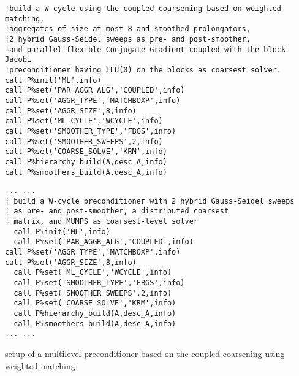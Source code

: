 \begin{listing}[h!]
\ifpdf
\begin{verbatim}
!build a W-cycle using the coupled coarsening based on weighted matching, 
!aggregates of size at most 8 and smoothed prolongators,
!2 hybrid Gauss-Seidel sweeps as pre- and post-smoother,
!and parallel flexible Conjugate Gradient coupled with the block-Jacobi 
!preconditioner having ILU(0) on the blocks as coarsest solver. 
call P%init('ML',info)
call P%set('PAR_AGGR_ALG','COUPLED',info)
call P%set('AGGR_TYPE','MATCHBOXP',info)
call P%set('AGGR_SIZE',8,info)
call P%set('ML_CYCLE','WCYCLE',info)
call P%set('SMOOTHER_TYPE','FBGS',info)
call P%set('SMOOTHER_SWEEPS',2,info)
call P%set('COARSE_SOLVE','KRM',info)
call P%hierarchy_build(A,desc_A,info)
call P%smoothers_build(A,desc_A,info)
\end{verbatim}
\else
\begin{center}
\begin{minipage}{.90\textwidth}
{\small
\begin{verbatim}
... ...
! build a W-cycle preconditioner with 2 hybrid Gauss-Seidel sweeps
! as pre- and post-smoother, a distributed coarsest
! matrix, and MUMPS as coarsest-level solver
  call P%init('ML',info)
  call P%set('PAR_AGGR_ALG','COUPLED',info)
call P%set('AGGR_TYPE','MATCHBOXP',info)
call P%set('AGGR_SIZE',8,info)
  call P%set('ML_CYCLE','WCYCLE',info)
  call P%set('SMOOTHER_TYPE','FBGS',info)
  call P%set('SMOOTHER_SWEEPS',2,info)
  call P%set('COARSE_SOLVE','KRM',info)
  call P%hierarchy_build(A,desc_A,info)
  call P%smoothers_build(A,desc_A,info)
... ...
\end{verbatim}
}
\end{minipage}
\end{center}
\fi\vspace{-2em}%
\caption{setup of a multilevel preconditioner based on the coupled coarsening using weighted matching\label{fig:ex3}}
\end{listing}\vspace*{-2em}
